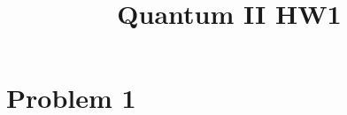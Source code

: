 \documentclass[a4paper,12pt]{article}
\title{Quantum II HW1}
\numberwithin{equation}{section}
\begin{document}
\maketitle

\begin{abstract}

\end{abstract}

\section{Problem 1}
\end{document}
